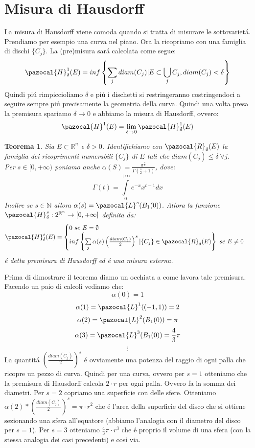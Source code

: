 \documentclass[11pt,a4paper]{report}
\theoremstyle{plain}
\newtheorem{thm}{Teorema}[chapter] %
\theoremstyle{definition}
\newcommand{\Ha}{\pazocal{H}_\delta}
\newcommand{\Le}{\pazocal{L}}
\begin{document}
\section{Misura di Hausdorff}
La misura di Hausdorff viene comoda quando si tratta di misurare le sottovariet\'a. Prendiamo per esempio una curva nel piano. Ora la ricopriamo con una famiglia di dischi $\{C_j\}$. La (pre)misura sar\'a calcolata come segue:
	\[
			\Ha^1(E) = inf\left\{\sum\limits_j diam(C_j) | E\subset \bigcup\limits_{j}C_j, diam(C_j) < \delta\right\}
	\]
	Quindi pi\'u rimpiccioliamo $\delta$ e pi\'u i dischetti si restringeranno costringendoci a seguire sempre pi\'u precisamente la geometria della curva. Quindi una volta presa la premisura spariamo $\delta \rightarrow 0$ e abbiamo la misura di Hausdorff, ovvero:
	\begin{equation}
		\pazocal{H}^1(E) = \lim\limits_{\delta \rightarrow 0} \Ha^1(E)
	\end{equation}
\begin{thm}
	Sia $E \subset \mathbb{R}^n$ e $\delta > 0$. Identifichiamo con $\pazocal{R}_\delta(E)$ la famiglia dei ricoprimenti numerabili $\{C_j\}$ di $E$ tali che $diam(C_j) \le \delta\ \forall j$.\\
	Per $s \in [0,+\infty)$ poniamo anche $\alpha(S) = \frac{\pi^{\frac{s}{2}}}{\Gamma(\frac{s}{2} + 1)}$, dove:
	\[
		\Gamma(t) = \int\limits_{0}^{+\infty}e^{-x}x^{t-1} dx	
	\]
	Inoltre se $s \in \mathbb{N}$ allora $\alpha(s) = \Le^s(B_1(0))$. Allora la funzione $\Ha^s : 2^{\mathbb{R}^n} \rightarrow [0,+\infty]$ definita da:
	\begin{equation}
			\Ha^s(E) = \begin{cases}
				0\ se\ E = \emptyset \\
				 inf\left\{\sum\limits_j \alpha(s) \left(\frac{diam(C_j)}{2}\right)^s | \{C_j\} \in  \pazocal{R}_\delta(E)\right\}\ se\ E \ne 0
			\end{cases}
	\end{equation}
	\'e detta premisura di Hausdorff ed \'e una misura esterna.
\end{thm}
Prima di dimostrare il teorema diamo un occhiata a come lavora tale premisura. Facendo un paio di calcoli vediamo che:
	\[
		\alpha(0) = 1
	\]
	\[
		\alpha(1) = \Le^1((-1,1)) = 2
	\]
		\[
		\alpha(2) = \Le^2(B_1(0)) = \pi
	\]
		\[
		\alpha(3) = \Le^3(B_1(0)) = \frac{4}{3}\pi
	\]
	\[
			\vdots
	\]
	La quantit\'a $\left(\frac{diam(C_j)}{2}\right)^s$ \'e ovviamente una potenza del raggio di ogni palla che ricopre un pezzo di curva. Quindi per una curva, ovvero per $s = 1$ otteniamo che la premisura di Hausdorff calcola $2\cdot r$ per ogni palla. Ovvero fa la somma dei diametri. Per $s=2$ copriamo una superficie con delle sfere. Otteniamo $\alpha(2) * \left(\frac{diam(C_j)}{2}\right)^s = \pi\cdot r^2$ che \'e l'area della superficie del disco che si ottiene sezionando una sfera all'equatore (abbiamo l'analogia con il diametro del disco per $s=1$). Per $s = 3$ otteniamo $\frac{4}{3}\pi \cdot r^3$ che \'e proprio il volume di una sfera (con la stessa analogia dei casi precedenti) e cos\'i via.
\end{document}
